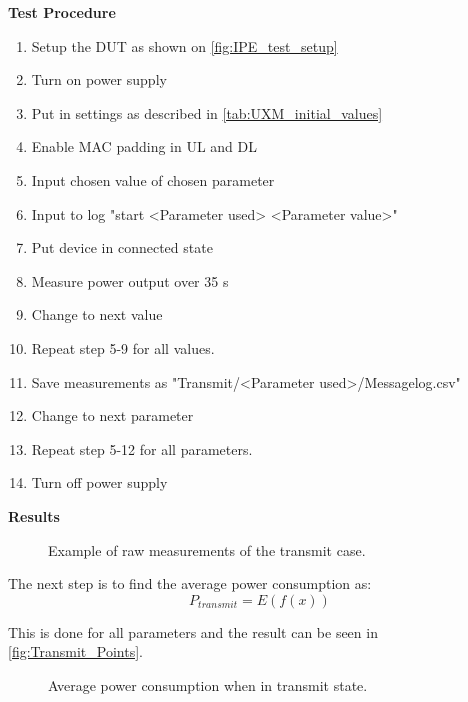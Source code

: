 \textbf{Test Procedure}\\
\begin{enumerate}
\item Setup the \gls{DUT} as shown on \autoref{fig:IPE_test_setup}
\item Turn on power supply 
\item Put in settings as described in \autoref{tab:UXM_initial_values} 
\item Enable MAC padding in UL and DL
\item Input chosen value of chosen parameter
\item Input to log "start <Parameter used> <Parameter value>"
\item Put device in connected state
\item Measure power output over 35 s
\item Change to next value
\item Repeat step 5-9 for all values.
\item Save measurements as "Transmit/<Parameter used>/Messagelog.csv"
\item Change to next parameter
\item Repeat step 5-12 for all parameters.
\item Turn off power supply
\end{enumerate}

\textbf{Results}\\
\begin{figure}[H]
\centering
\resizebox{\textwidth}{!}{
}
\caption{Example of raw measurements of the transmit case.}
\label{fig:device_power_setup}
\end{figure}

The next step is to find the average power consumption as:
\begin{equation}
P_{transmit} = E(f(x))
\end{equation}
\begin{where}
\end{where}

This is done for all parameters and the result can be seen in \autoref{fig:Transmit_Points}.

\begin{figure}[H]
\centering
\begin{minipage}{0.48\textwidth}
\resizebox{\textwidth}{!}{
}
\end{minipage}
\hfill
\begin{minipage}{0.48\textwidth}
\resizebox{\textwidth}{!}{
}
\end{minipage}
\caption{Average power consumption when in transmit state.}
\label{fig:Transmit_Points}
\end{figure}

